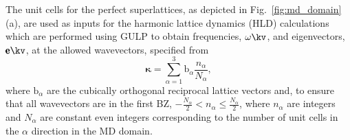 The unit cells for the perfect superlattices, as depicted in Fig.~\ref{fig:md_domain}(a), are used as inputs for the harmonic lattice dynamics (HLD) calculations which are performed using GULP \cite{GULP} to obtain frequencies, $\omega \kv$, and eigenvectors, $ \pmb{\mathrm{e}} \kv$, at the allowed wavevectors, specified from
\begin{equation}\label{EQ:NMD:allowdkpt}
\pmb{\kappa} = \sum_{\alpha=1}^3 \pmb{\mathrm{b}}_{\alpha} \frac{n_{\alpha}}{N_{\alpha}},
\end{equation}
where $\pmb{\mathrm{b}}_\alpha$ are the cubically orthogonal reciprocal lattice vectors and, to ensure that all wavevectors are in the first BZ, $ -\frac{N_\alpha}{2} < n_\alpha \le \frac {N_\alpha}{2}$, where $n_\alpha$ are integers and $N_\alpha$ are constant even integers corresponding to the number of unit cells in the $\alpha$ direction in the MD domain. 
\begin{comment}
Group velocities were calculated using finite differencing about a given frequency from \cite{ziman_electrons_2001}
\begin{equation}\label{EQ:NMD:vg}
\begin{split}
\pmb{\mathrm{v}}_{g}\kv=\frac{\partial \omega \kv}{\partial \pmb{\kappa}}.
\end{split}
\end{equation}
The eigenvectors, from HLD, and the atomic velocities, from MD simulations performed using LAMMPS\cite{LAMMPS}, are are used as inputs to obtain the trajectory of the time derivative at time, $t$, of the normal mode coordinate, $\dot{q}\kvt{}{}{}$, 
\begin{equation}\label{EQ:NMD:qdot}
\begin{split}
\dot{q}\kvt{}{}{}=&\SUM{0}{}\sqrt{\frac{m_b}{N}}\dot{u}_{\alpha}\lbt e^*\kvba\EXP{i\pmb{\kappa}\cdot\mathbf{r}_0\ab{l}{0}},
\end{split}
\end{equation}
where $\dot{u}_{\alpha}\lbt$ is the component of velocity of atom $b$ in the $l$th unit cell with equilibrium position $\mathbf{r}_0\ab{l}{0}$ in direction $\alpha$ and $e^*\kvba$ denotes the complex conjugate of the $\alpha$-component for atom $b$ of the eigenvector for mode  ~$\kv$. By taking the Fourier transform of the autocorrelation of Eq. (\ref{EQ:NMD:qdot}), the mode power spectrum is obtained \cite{dove_introduction_1993-3}
\begin{equation}\label{EQ:NMD:SED}
\begin{split}
T\kvw=&\lim_{\tau_0\rightarrow\infty}\frac{1}{2\tau_0}\left|\frac{1}{\sqrt{2\pi}}\int_{0}^{\tau_0}\dot{q}\kvt\exp(-i\omega t)dt\right|^2.
\end{split}
\end{equation}
\end{comment}
